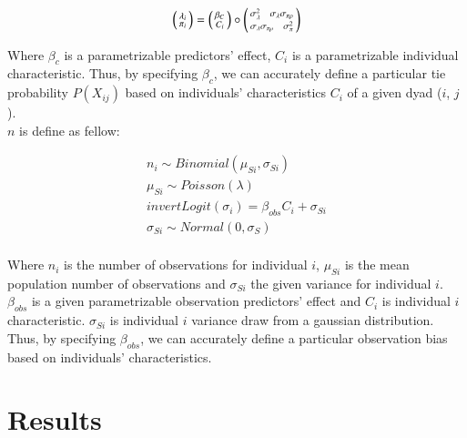 \documentclass[Afour,sageh,times]{sagej}
\begin{document}
\begin{ceqn}
  \begin{align}\label{rho}
    \begin{psmallmatrix}
      \lambda_{i}\\
      \pi_{i}
    \end{psmallmatrix} = 
    \begin{psmallmatrix}
      \beta_{C}\\C_{i}
    \end{psmallmatrix} \circ 
    \begin{psmallmatrix}
      \sigma_{\lambda}^{2} \ \ \ \sigma_{\lambda}{\sigma_{\pi \rho }}\\
      \sigma_{\lambda}{\sigma_{\pi \rho }} \ \ \ \sigma_{\pi}^{2}
    \end{psmallmatrix}
  \end{align}
\end{ceqn}
Where $\beta_{c}$ is a parametrizable predictors' effect, $C_{i}$ is a parametrizable individual characteristic. Thus, by specifying $\beta_{c}$, we can accurately define a particular tie probability $P(X_{ij})$ based on individuals' characteristics $C_{i}$ of a given dyad ($i$, $j$).\\
$n$ is define as fellow: 
\begin{ceqn}
  \begin{align}\label{n}
    n_{i} \sim Binomial(\mu_{Si}, \sigma_{Si})\\
    \mu_{Si} \sim Poisson(\lambda)\\ 
    invertLogit(\sigma_{i}) = \beta_{obs}C_{i} + \sigma_{Si}\\
    \sigma_{Si} \sim Normal(0, \sigma_{S})\\    
  \end{align}
\end{ceqn}

Where $n_{i}$ is the number of observations for individual $i$, $\mu_{Si}$ is the mean population number of observations and $\sigma_{Si}$ the given variance for individual $i$. $\beta_{obs}$ is a given parametrizable observation predictors' effect and $C_{i}$ is individual $i$ characteristic. $\sigma_{Si}$ is individual $i$ variance draw from a gaussian distribution. Thus, by specifying $\beta_{obs}$, we can accurately define a particular observation bias based on individuals' characteristics.

\section{Results}
\end{document}
